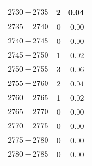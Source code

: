 \begin{longtable}{|l|r|r|}
		{\color[HTML]{000000} $ 2730 - 2735 $} & {\color[HTML]{000000} 2}                                                      & {\color[HTML]{000000} 0.04}                                                     \\ \hline
		{\color[HTML]{000000} $ 2735 - 2740 $} & {\color[HTML]{000000} 0}                                                      & {\color[HTML]{000000} 0.00}                                                     \\ \hline
		{\color[HTML]{000000} $ 2740 - 2745 $} & {\color[HTML]{000000} 0}                                                      & {\color[HTML]{000000} 0.00}                                                     \\ \hline
		{\color[HTML]{000000} $ 2745 - 2750 $} & {\color[HTML]{000000} 1}                                                      & {\color[HTML]{000000} 0.02}                                                     \\ \hline
		{\color[HTML]{000000} $ 2750 - 2755 $} & {\color[HTML]{000000} 3}                                                      & {\color[HTML]{000000} 0.06}                                                     \\ \hline
		{\color[HTML]{000000} $ 2755 - 2760 $} & {\color[HTML]{000000} 2}                                                      & {\color[HTML]{000000} 0.04}                                                     \\ \hline
		{\color[HTML]{000000} $ 2760 - 2765 $} & {\color[HTML]{000000} 1}                                                      & {\color[HTML]{000000} 0.02}                                                     \\ \hline
		{\color[HTML]{000000} $ 2765 - 2770 $} & {\color[HTML]{000000} 0}                                                      & {\color[HTML]{000000} 0.00}                                                     \\ \hline
		{\color[HTML]{000000} $ 2770 - 2775 $} & {\color[HTML]{000000} 0}                                                      & {\color[HTML]{000000} 0.00}                                                     \\ \hline
		{\color[HTML]{000000} $ 2775 - 2780 $} & {\color[HTML]{000000} 0}                                                      & {\color[HTML]{000000} 0.00}                                                     \\ \hline
		{\color[HTML]{000000} $ 2780 - 2785 $} & {\color[HTML]{000000} 0}                                                      & {\color[HTML]{000000} 0.00}                                                     \\ \hline

\end{longtable}

